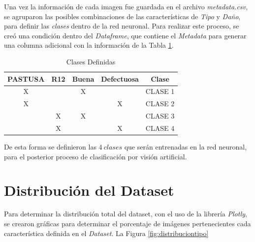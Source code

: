 Una vez la información de cada imagen fue guardada en el archivo \textit{metadata.csv}, se agruparon las posibles combinaciones de las características de \textit{Tipo} y \textit{Daño}, para definir las \textit{clases} dentro de la red neuronal. Para realizar este proceso, se creó una condición dentro del \textit{Dataframe}, que contiene el \textit{Metadata} para generar una columna adicional con la información de la Tabla \ref{table:Clases}.	

\begin{table}[ht]
	\centering
	\begin{tabular}{|c|c|c|c|c|}
		\hline
		PASTUSA & R12 & Buena & Defectuosa & Clase \\
		\hline
		X &  & X &  & CLASE 1 \\
		\hline
		X &  &  & X & CLASE 2 \\
		\hline
		& X & X &  & CLASE 3 \\
		\hline
		& X &  & X & CLASE 4 \\
		\hline
	\end{tabular}	
	\caption{Clases Definidas}
	\label{table:Clases}
\end{table}	

De esta forma se definieron las $4 \ clases$ que serán entrenadas en la red neuronal, para el posterior proceso de clasificación por visión artificial. 


\newpage
\section{Distribución del Dataset}

Para determinar la distribución total del dataset, con el uso de la librería \textit{Plotly}, se crearon gráficas para determinar el porcentaje de imágenes pertenecientes cada característica definida en el \textit{Dataset}. La Figura \ref{fig:distribuciontipo}

